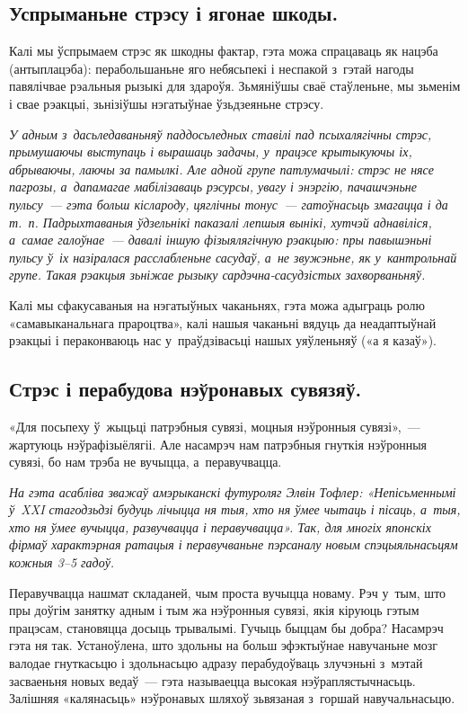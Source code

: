 \subsection*{Успрыманьне стрэсу і ягонае шкоды.}

Калі мы ўспрымаем стрэс як шкодны фактар, гэта можа спрацаваць як нацэба (антыплацэба): перабольшаньне яго небясьпекі і неспакой з~гэтай нагоды павялічвае рэальныя рызыкі для здароўя. Зьмяніўшы сваё стаўленьне, мы зьменім і свае рэакцыі, зьнізіўшы нэгатыўнае ўзьдзеяньне стрэсу.

\emph{У адным з~дасьледаваньняў паддосьледных ставілі пад псыхалягічны стрэс, прымушаючы выступаць і вырашаць задачы, у~працэсе крытыкуючы іх, абрываючы, лаючы за памылкі. Але адной групе патлумачылі: стрэс не нясе пагрозы, а~дапамагае мабілізаваць рэсурсы, увагу і энэргію, пачашчэньне пульсу~--- гэта больш кіслароду, цяглічны тонус~--- гатоўнасьць змагацца і да т.~п. Падрыхтаваныя ўдзельнікі паказалі лепшыя вынікі, хутчэй аднавіліся, а~самае галоўнае~--- давалі іншую фізыялягічную рэакцыю: пры павышэньні пульсу ў~іх назіралася расслабленьне сасудаў, а~не звужэньне, як у~кантрольнай групе. Такая рэакцыя зьніжае рызыку сардэчна-сасудзістых захворваньняў.}

Калі мы сфакусаваныя на нэгатыўных чаканьнях, гэта можа адыграць ролю «самавыканальнага прароцтва», калі нашыя чаканьні вядуць да неадаптыўнай рэакцыі і пераконваюць нас у~праўдзівасьці нашых уяўленьняў («а я казаў»).

\subsection*{Стрэс і перабудова нэўронавых сувязяў.}

«Для посьпеху ў~жыцьці патрэбныя сувязі, моцныя нэўронныя сувязі»,~--- жартуюць нэўрафізыёлягіі. Але насамрэч нам патрэбныя гнуткія нэўронныя сувязі, бо нам трэба не вучыцца, а~перавучвацца. 

\emph{На гэта асабліва зважаў амэрыканскі футуроляг Элвін Тофлер: «Непісьменнымі ў~XXI стагодзьдзі будуць лічыцца ня тыя, хто ня ўмее чытаць і пісаць, а~тыя, хто ня ўмее вучыцца, развучвацца і перавучвацца». Так, для многіх японскіх фірмаў характэрная ратацыя і перавучваньне пэрсаналу новым спэцыяльнасьцям кожныя 3--5 гадоў.}

Перавучвацца нашмат складаней, чым проста вучыцца новаму. Рэч у~тым, што пры доўгім занятку адным і тым жа нэўронныя сувязі, якія кіруюць гэтым працэсам, становяцца досыць трывалымі. Гучыць быццам бы добра? Насамрэч гэта ня так. Устаноўлена, што здольны на больш эфэктыўнае навучаньне мозг валодае гнуткасьцю і здольнасьцю адразу перабудоўваць злучэньні з~мэтай засваеньня новых ведаў~--- гэта называецца высокая нэўраплястычнасьць. Залішняя «калянасьць» нэўронавых шляхоў зьвязаная з~горшай навучальнасьцю.

